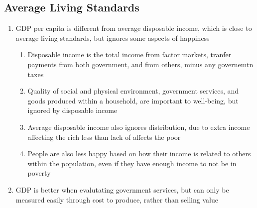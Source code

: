 \documentclass[11 pt, twoside]{article}
\begin{document}
\subsection{Average Living Standards}
\begin{enumerate}
\item GDP per capita is different from average disposable income, which is close to average living standards, but ignores some aspects of happiness
\begin{enumerate}
\item Disposable income is the total income from factor markets, tranfer payments from both government, and from others, minus any governemtn taxes
\item Quality of social and physical environment, government services, and goods produced within a household, are important to well-being, but ignored by disposable income
\item Average disposable income also ignores distribution, due to extra income affecting the rich less than lack of affects the poor
\item People are also less happy based on how their income is related to others within the population, even if they have enough income to not be in poverty
\end{enumerate}
\item GDP is better when evalutating government services, but can only be measured easily through cost to produce, rather than selling value
\end{enumerate}
\end{document}
